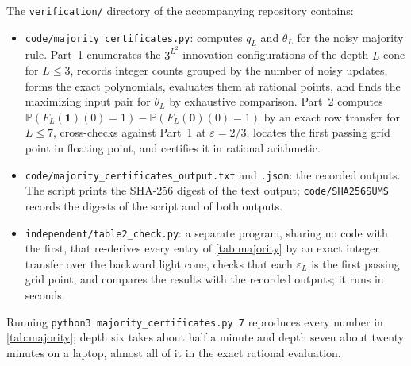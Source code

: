\documentclass[11pt]{article}
\theoremstyle{plain}
\theoremstyle{definition}
\theoremstyle{remark}
\newcommand{\Prob}{\mathbb{P}}
\newcommand{\eps}{\varepsilon}
\begin{document}
The \texttt{verification/} directory of the accompanying repository contains:
\begin{itemize}
\item \texttt{code/majority\_certificates.py}: computes $q_L$ and $\theta_L$ for the noisy majority rule. Part~1 enumerates the $3^{L^2}$ innovation configurations of the depth-$L$ cone for $L\le3$, records integer counts grouped by the number of noisy updates, forms the exact polynomials, evaluates them at rational points, and finds the maximizing input pair for $\theta_L$ by exhaustive comparison. Part~2 computes $\Prob(F_L(\mathbf 1)(0)=1)-\Prob(F_L(\mathbf 0)(0)=1)$ by an exact row transfer for $L\le7$, cross-checks against Part~1 at $\eps=2/3$, locates the first passing grid point in floating point, and certifies it in rational arithmetic.
\item \texttt{code/majority\_certificates\_output.txt} and \texttt{.json}: the recorded outputs. The script prints the SHA-256 digest of the text output; \texttt{code/SHA256SUMS} records the digests of the script and of both outputs.
\item \texttt{independent/table2\_check.py}: a separate program, sharing no code with the first, that re-derives every entry of \cref{tab:majority} by an exact integer transfer over the backward light cone, checks that each $\eps_L$ is the first passing grid point, and compares the results with the recorded outputs; it runs in seconds.
\end{itemize}
Running \texttt{python3 majority\_certificates.py 7} reproduces every number in \cref{tab:majority}; depth six takes about half a minute and depth seven about twenty minutes on a laptop, almost all of it in the exact rational evaluation.
\end{document}
